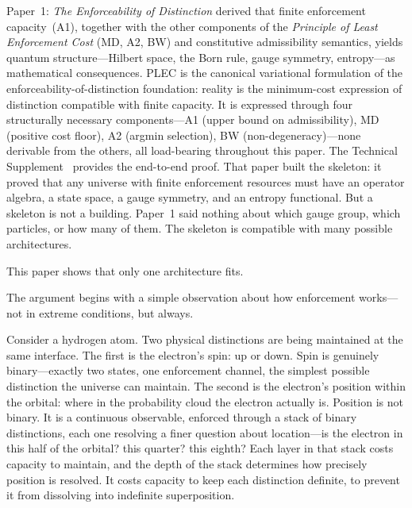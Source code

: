 \documentclass[11pt]{article}
\begin{document}
Paper~1: \emph{The Enforceability of Distinction} derived that finite enforcement capacity~(A1), together with the other components of the \emph{Principle of Least Enforcement Cost} (MD, A2, BW) and constitutive admissibility semantics, yields quantum structure---Hilbert space, the Born rule, gauge symmetry, entropy---as mathematical consequences.  PLEC is the canonical variational formulation of the enforceability-of-distinction foundation: reality is the minimum-cost expression of distinction compatible with finite capacity.  It is expressed through four structurally necessary components---A1 (upper bound on admissibility), MD (positive cost floor), A2 (argmin selection), BW (non-degeneracy)---none derivable from the others, all load-bearing throughout this paper.  The Technical Supplement~\cite{BrookeSupplement} provides the end-to-end proof.  That paper built the skeleton: it proved that any universe with finite enforcement resources must have an operator algebra, a state space, a gauge symmetry, and an entropy functional.  But a skeleton is not a building.  Paper~1 said nothing about which gauge group, which particles, or how many of them.  The skeleton is compatible with many possible architectures.

This paper shows that only one architecture fits.

The argument begins with a simple observation about how enforcement works---not in extreme conditions, but always.

Consider a hydrogen atom.  Two physical distinctions are being maintained at the same interface.  The first is the electron's spin: up or down.  Spin is genuinely binary---exactly two states, one enforcement channel, the simplest possible distinction the universe can maintain.  The second is the electron's position within the orbital: where in the probability cloud the electron actually is.  Position is not binary.  It is a continuous observable, enforced through a stack of binary distinctions, each one resolving a finer question about location---is the electron in this half of the orbital? this quarter? this eighth?  Each layer in that stack costs capacity to maintain, and the depth of the stack determines how precisely position is resolved.  It costs capacity to keep each distinction definite, to prevent it from dissolving into indefinite superposition.
\end{document}

